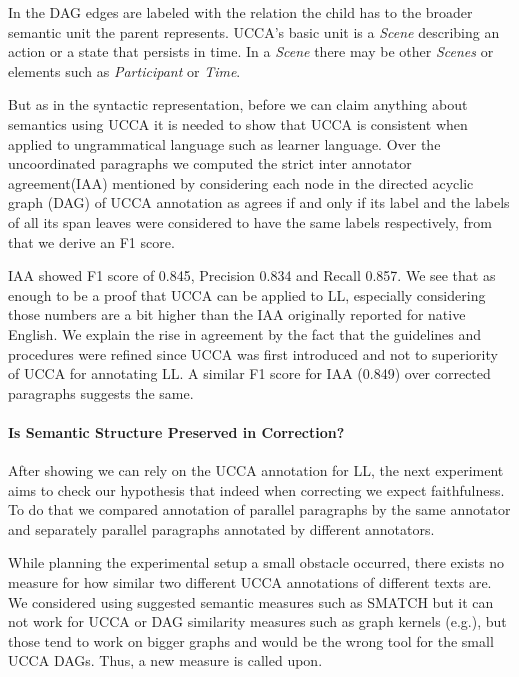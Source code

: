 \documentclass[letter,11pt]{article}
\begin{document}
In the DAG edges are labeled with the relation the child has to the broader semantic unit the parent represents. UCCA's basic unit is a \textit{Scene} describing an action or a state that persists in time. In a \textit{Scene} there may be other \textit{Scenes} or elements such as \textit{Participant} or \textit{Time}. 

But as in the syntactic representation, before we can claim anything
about semantics using UCCA it is needed to show that UCCA is
consistent when applied to ungrammatical language such as learner
language. Over the uncoordinated paragraphs
we computed the strict inter annotator agreement(IAA) mentioned by \cite{abend2013universal}
considering each node in the directed acyclic graph (DAG) of UCCA
annotation as agrees if and only if its label and the labels of all
its span leaves were considered to have the same labels respectively,
from that we derive an F1 score. 

IAA showed F1 score of 0.845, Precision 0.834 and Recall 0.857. We see that as enough to be a proof that UCCA can be applied to LL, especially considering those numbers
are a bit higher than the IAA originally reported
for native English\cite{abend2013universal}.
We explain the rise in agreement by the fact that the guidelines and
procedures were refined since UCCA was first introduced and not to
superiority of UCCA for annotating LL. A similar F1
score for IAA (0.849) over corrected paragraphs
suggests the same.

\paragraph{Is Semantic Structure Preserved in Correction?}

After showing we can rely on the UCCA annotation for LL, the next experiment aims to check our hypothesis that indeed when correcting we expect faithfulness.
To do that we compared annotation of parallel paragraphs by the same annotator and separately parallel paragraphs annotated by different annotators. 

While planning the experimental setup a small obstacle occurred,
there exists no measure for how similar two different UCCA annotations of different texts are. We considered using suggested semantic measures
such as SMATCH\cite{cai2013smatch} but it can not work for UCCA or
DAG similarity measures such as graph kernels (e.g.\cite{kashima2003marginalized}),
but those tend to work on bigger graphs and would be the wrong tool
for the small UCCA DAGs. Thus, a new measure is called upon.
\end{document}

